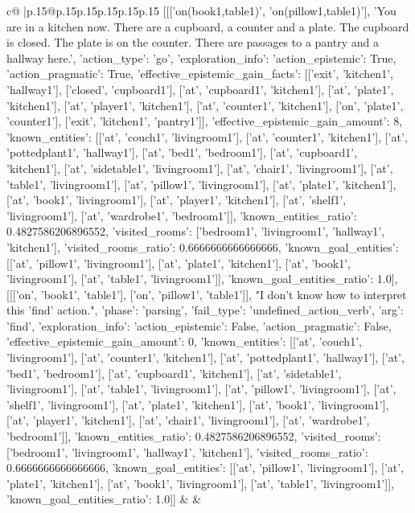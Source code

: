 \documentclass{article}
\begin{document}
{\begin{supertabular}{c@{$\;$}|p{.15\linewidth}@{}p{.15\linewidth}p{.15\linewidth}p{.15\linewidth}p{.15\linewidth}p{.15\linewidth}}
{{{	 [[['on(book1,table1)', 'on(pillow1,table1)'], 'You are in a kitchen now. There are a cupboard, a counter and a plate. The cupboard is closed. The plate is on the counter. There are passages to a pantry and a hallway here.', {'action_type': 'go', 'exploration_info': {'action_epistemic': True, 'action_pragmatic': True, 'effective_epistemic_gain_facts': [['exit', 'kitchen1', 'hallway1'], ['closed', 'cupboard1'], ['at', 'cupboard1', 'kitchen1'], ['at', 'plate1', 'kitchen1'], ['at', 'player1', 'kitchen1'], ['at', 'counter1', 'kitchen1'], ['on', 'plate1', 'counter1'], ['exit', 'kitchen1', 'pantry1']], 'effective_epistemic_gain_amount': 8, 'known_entities': [['at', 'couch1', 'livingroom1'], ['at', 'counter1', 'kitchen1'], ['at', 'pottedplant1', 'hallway1'], ['at', 'bed1', 'bedroom1'], ['at', 'cupboard1', 'kitchen1'], ['at', 'sidetable1', 'livingroom1'], ['at', 'chair1', 'livingroom1'], ['at', 'table1', 'livingroom1'], ['at', 'pillow1', 'livingroom1'], ['at', 'plate1', 'kitchen1'], ['at', 'book1', 'livingroom1'], ['at', 'player1', 'kitchen1'], ['at', 'shelf1', 'livingroom1'], ['at', 'wardrobe1', 'bedroom1']], 'known_entities_ratio': 0.4827586206896552, 'visited_rooms': ['bedroom1', 'livingroom1', 'hallway1', 'kitchen1'], 'visited_rooms_ratio': 0.6666666666666666, 'known_goal_entities': [['at', 'pillow1', 'livingroom1'], ['at', 'plate1', 'kitchen1'], ['at', 'book1', 'livingroom1'], ['at', 'table1', 'livingroom1']], 'known_goal_entities_ratio': 1.0}}], [[['on', 'book1', 'table1'], ['on', 'pillow1', 'table1']], "I don't know how to interpret this 'find' action.", {'phase': 'parsing', 'fail_type': 'undefined_action_verb', 'arg': 'find', 'exploration_info': {'action_epistemic': False, 'action_pragmatic': False, 'effective_epistemic_gain_amount': 0, 'known_entities': [['at', 'couch1', 'livingroom1'], ['at', 'counter1', 'kitchen1'], ['at', 'pottedplant1', 'hallway1'], ['at', 'bed1', 'bedroom1'], ['at', 'cupboard1', 'kitchen1'], ['at', 'sidetable1', 'livingroom1'], ['at', 'table1', 'livingroom1'], ['at', 'pillow1', 'livingroom1'], ['at', 'shelf1', 'livingroom1'], ['at', 'plate1', 'kitchen1'], ['at', 'book1', 'livingroom1'], ['at', 'player1', 'kitchen1'], ['at', 'chair1', 'livingroom1'], ['at', 'wardrobe1', 'bedroom1']], 'known_entities_ratio': 0.4827586206896552, 'visited_rooms': ['bedroom1', 'livingroom1', 'hallway1', 'kitchen1'], 'visited_rooms_ratio': 0.6666666666666666, 'known_goal_entities': [['at', 'pillow1', 'livingroom1'], ['at', 'plate1', 'kitchen1'], ['at', 'book1', 'livingroom1'], ['at', 'table1', 'livingroom1']], 'known_goal_entities_ratio': 1.0}}]] 
	  } 
	   } 
	   } 
	 & & \\ 
 


\end{supertabular}}
\end{document}
